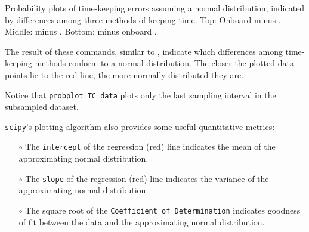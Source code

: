 \begin{enumerate}
\begin{marginfigure}[-19.cm]
\begin{center}
		\caption[Probability plots of time-keeping errors]{Probability plots of time-keeping errors assuming a normal distribution, indicated by differences among three methods of keeping time.
			Top: Onboard \rtc minus  \rtc. Middle: \ntp minus  \rtc. Bottom: \ntp minus onboard \rtc. }
	\end{center}
\end{marginfigure}
	The result of these commands, similar to , indicate which differences among time-keeping methods conform to a normal distribution.
	The closer the plotted data points lie to the red line, the more normally distributed they are.
	
	\smallskip
	Notice that \lstinline{probplot_TC_data} plots only the last sampling interval in the subsampled dataset. 
	
	\smallskip
	\texttt{scipy}'s plotting algorithm also provides some useful quantitative metrics:
	\begin{itemize}
		\item[$\circ$] The \texttt{intercept} of the regression (red) line indicates the mean of the approximating normal distribution.
		\item[$\circ$] The \texttt{slope} of the regression (red) line indicates the variance of the approximating normal distribution.
		\item[$\circ$] The square root of the \texttt{Coefficient of Determination} indicates goodness of fit between the data and the approximating normal distribution.
	\end{itemize}
	

\end{enumerate}
